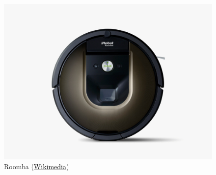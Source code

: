 \begin{figure}[!h]
	\centering
	\includegraphics[scale=0.1]{./EtapaModerna/Imagenes/roomba.jpg}
	\caption{Roomba (\href{https://commons.wikimedia.org/wiki/File:IRobot\_Roomba\_980.jpg}{Wikimedia})}
	\label{fig:roomba}
\end{figure}